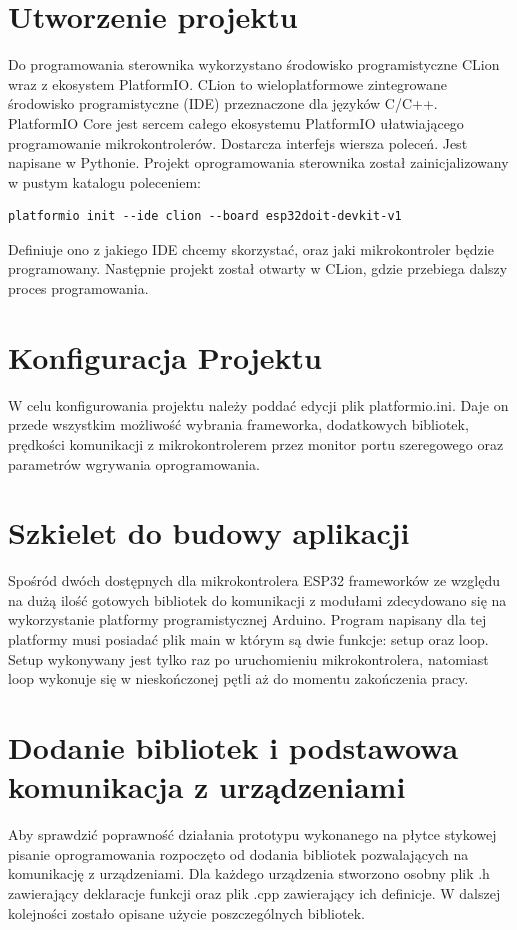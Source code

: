 \documentclass[11pt]{report}
\begin{document}
 \section{Utworzenie projektu}
 Do programowania sterownika wykorzystano środowisko programistyczne CLion wraz z ekosystem PlatformIO.
 CLion to wieloplatformowe zintegrowane środowisko programistyczne (IDE) przeznaczone dla języków C/C++.
 PlatformIO Core jest sercem całego ekosystemu PlatformIO ułatwiającego programowanie mikrokontrolerów. Dostarcza interfejs wiersza poleceń. Jest napisane w Pythonie.
 Projekt oprogramowania sterownika został zainicjalizowany w pustym katalogu poleceniem:
 \begin{lstlisting}
platformio init --ide clion --board esp32doit-devkit-v1 
 \end{lstlisting}
 Definiuje ono z jakiego IDE chcemy skorzystać, oraz jaki mikrokontroler będzie programowany.
 Następnie projekt został otwarty w CLion, gdzie przebiega dalszy proces programowania.
 
 \section{Konfiguracja Projektu}
 W celu konfigurowania projektu należy poddać edycji plik platformio.ini. Daje on przede wszystkim możliwość wybrania frameworka, dodatkowych bibliotek, prędkości komunikacji z mikrokontrolerem przez monitor portu szeregowego oraz parametrów wgrywania oprogramowania.
 
 \section{Szkielet do budowy aplikacji}
 Spośród dwóch dostępnych dla mikrokontrolera ESP32 frameworków ze względu na dużą ilość gotowych bibliotek do komunikacji z modułami zdecydowano się na wykorzystanie platformy programistycznej Arduino.
 Program napisany dla tej platformy musi posiadać plik main w którym są dwie funkcje: setup oraz loop.
 Setup wykonywany jest tylko raz po uruchomieniu mikrokontrolera, natomiast loop wykonuje się w nieskończonej pętli aż do momentu zakończenia pracy.
 
 \section{Dodanie bibliotek i podstawowa komunikacja z urządzeniami}
 Aby sprawdzić poprawność działania prototypu wykonanego na płytce stykowej pisanie oprogramowania rozpoczęto od dodania bibliotek pozwalających na komunikację z urządzeniami. Dla każdego urządzenia stworzono osobny plik .h zawierający deklaracje funkcji oraz plik .cpp zawierający ich definicje.
 W dalszej kolejności zostało opisane użycie poszczególnych bibliotek.
\end{document}
